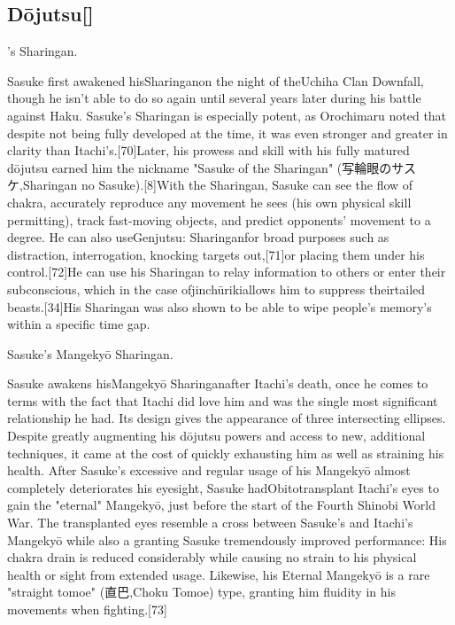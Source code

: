 \documentclass[a4paper,12pt]{article}
\begin{document}
\subsection*{Dōjutsu[]}\n\nSasuke's Sharingan.\\ \par \vspace{0.5cm}

Sasuke first awakened hisSharinganon the night of theUchiha Clan Downfall, though he isn't able to do so again until several years later during his battle against Haku. Sasuke's Sharingan is especially potent, as Orochimaru noted that despite not being fully developed at the time, it was even stronger and greater in clarity than Itachi's.[70]Later, his prowess and skill with his fully matured dōjutsu earned him the nickname "Sasuke of the Sharingan" (写輪眼のサスケ,Sharingan no Sasuke).[8]With the Sharingan, Sasuke can see the flow of chakra, accurately reproduce any movement he sees (his own physical skill permitting), track fast-moving objects, and predict opponents' movement to a degree. He can also useGenjutsu: Sharinganfor broad purposes such as distraction, interrogation, knocking targets out,[71]or placing them under his control.[72]He can use his Sharingan to relay information to others or enter their subconscious, which in the case ofjinchūrikiallows him to suppress theirtailed beasts.[34]His Sharingan was also shown to be able to wipe people's memory's within a specific time gap.\\ \par \vspace{0.5cm}

Sasuke's Mangekyō Sharingan.\\ \par \vspace{0.5cm}

Sasuke awakens hisMangekyō Sharinganafter Itachi's death, once he comes to terms with the fact that Itachi did love him and was the single most significant relationship he had. Its design gives the appearance of three intersecting ellipses. Despite greatly augmenting his dōjutsu powers and access to new, additional techniques, it came at the cost of quickly exhausting him as well as straining his health. After Sasuke's excessive and regular usage of his Mangekyō almost completely deteriorates his eyesight, Sasuke hadObitotransplant Itachi's eyes to gain the "eternal" Mangekyō, just before the start of the Fourth Shinobi World War. The transplanted eyes resemble a cross between Sasuke's and Itachi's Mangekyō while also a granting Sasuke tremendously improved performance: His chakra drain is reduced considerably while causing no strain to his physical health or sight from extended usage. Likewise, his Eternal Mangekyō is a rare "straight tomoe" (直巴,Choku Tomoe) type, granting him fluidity in his movements when fighting.[73]\\ \par \vspace{0.5cm}
\end{document}
